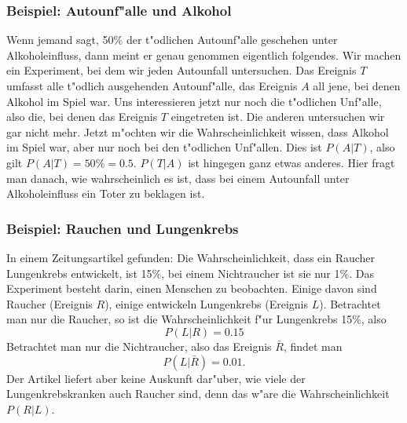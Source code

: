 \subsubsection{Beispiel: Autounf"alle und Alkohol}
Wenn jemand sagt, 50\%
der t"odlichen Autounf"alle geschehen unter Alkoholeinfluss, dann
meint er genau genommen eigentlich folgendes.
Wir machen ein Experiment,
bei dem wir jeden Autounfall untersuchen.
Das Ereignis $T$ umfasst alle
t"odlich ausgehenden Autounf"alle, das Ereignis $A$ all jene, bei denen
Alkohol im Spiel war.
Uns interessieren jetzt nur noch die t"odlichen
Unf"alle, also die, bei denen das Ereignis $T$ eingetreten ist. 
Die anderen untersuchen wir gar nicht mehr.
Jetzt m"ochten wir die
Wahrscheinlichkeit wissen, dass Alkohol im Spiel war, aber nur noch
bei den t"odlichen Unf"allen.
Dies ist $P(A|T)$, also gilt
$P(A|T)=50\% = 0.5$.
$P(T|A)$ ist hingegen ganz etwas anderes.
Hier fragt man danach,
wie wahrscheinlich es ist, dass bei einem Autounfall unter Alkoholeinfluss
ein Toter zu beklagen ist.

\subsubsection{Beispiel: Rauchen und Lungenkrebs}
In einem Zeitungsartikel gefunden: Die Wahrscheinlichkeit, dass ein Raucher
Lungenkrebs entwickelt, ist 15\%, bei einem Nichtraucher ist sie nur 1\%.
Das Experiment besteht darin, einen Menschen zu beobachten.
Einige
davon sind Raucher (Ereignis $R$), einige entwickeln Lungenkrebs (Ereignis $L$).
Betrachtet man nur die Raucher, so ist die Wahrscheinlichkeit f"ur
Lungenkrebs 15\%, also
\[
P(L|R)=0.15
\]
Betrachtet man nur die Nichtraucher, also das Ereignis $\bar R$, findet
man 
\[
P(L|\bar R)=0.01.
\]
Der Artikel liefert aber keine Auskunft dar"uber, wie viele der
Lungenkrebskranken auch Raucher sind, denn das w"are die Wahrscheinlichkeit
$P(R|L)$.

